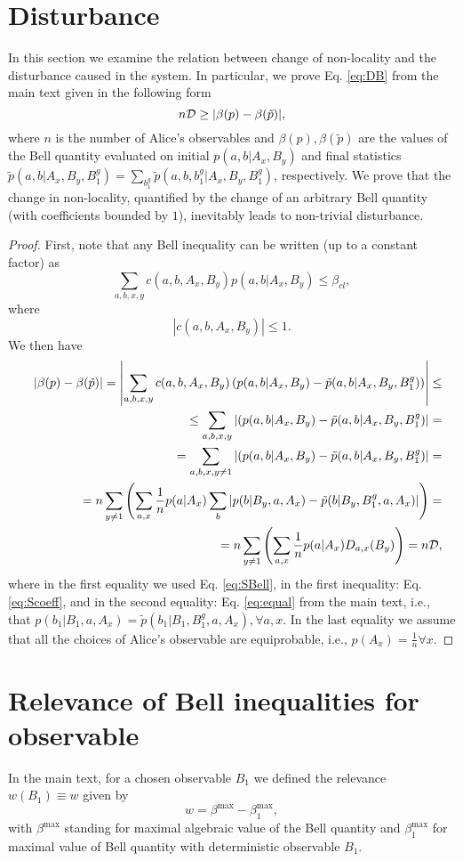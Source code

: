 \documentclass[pra,twocolumn,showpacs,preprintnumbers,amsmath,amssymb,superscriptaddress]{revtex4-1}
\def\be{\begin{equation}}
\def\ee{\end{equation}}
\def\ben{\begin{eqnarray}}
\def\een{\end{eqnarray}}
\def\omeas{B_1}
\def\ogentle{B_1^g}
\def\dist{{\cal D}}
\def\relev{w}
\begin{document}
\begin{appendix}
\section{Disturbance}\label{secDIST}
In this section we examine the relation between change of non-locality and the disturbance caused in the system. In particular, we prove Eq. \eqref{eq:DB} from the main text given in the following form
\be
\label{eq:SDB}
n \dist \geq |\beta(p)- \beta(\tilde p)|,
\ee
where $n$ is the number of Alice's observables and $\beta(p), \beta(\tilde p)$ are the values of the Bell quantity evaluated on initial $p(a,b|A_x,B_y)$ and final statistics $\tilde p(a,b|A_x,B_y,\ogentle)=\sum_{b_1^g} \tilde p(a,b,b_1^g|A_x,B_y,\ogentle)$, respectively. We prove that the change in non-locality, quantified by the change of an arbitrary Bell quantity (with coefficients bounded by $1$), inevitably leads to non-trivial disturbance.\\
\begin{proof}
First, note that
any Bell inequality can be written (up to a constant factor) as
\be
\label{eq:SBell}
\sum_{a,b,x,y} c(a,b,A_x,B_y) p(a,b|A_x,B_y) \leq \beta_{cl},
\ee
where 
\be
\label{eq:Scoeff}
|c(a,b,A_x,B_y)|\leq 1.
\ee
We then have
\ben
&&|\beta(p) - \beta(\tilde p)| = \left|
\sum_{a,b,x,y} c(a,b,A_x,B_y) \left(p(a,b|A_x,B_y) -\tilde p(a,b|A_x,B_y,\ogentle) \right)\right| \leq  \nonumber \\
&&\leq 
\sum_{a,b,x,y} \left|(p(a,b|A_x,B_y) -\tilde p(a,b|A_x,B_y,\ogentle) \right| =  \nonumber \\
&& =
\sum_{a,b,x,y\not=1} \left|(p(a,b|A_x,B_y) -\tilde p(a,b|A_x,B_y,\ogentle) \right| =  \nonumber \\
&& = 
n \sum_{y\not=1}  \left(\sum_{a,x} \frac{1}{n} p(a|A_x) \sum_b |p(b|B_y,a,A_x) - \tilde p(b|B_y,\ogentle,a,A_x)| \right)=
\nonumber  \\
&& =
n \sum_{y\not=1}  \left(\sum_{a,x} \frac{1}{n} p(a|A_x) D_{a,x}(B_y)\right) =n  \dist,
\een
where in the first equality we used Eq. \eqref{eq:SBell}, in the first inequality: Eq.\eqref{eq:Scoeff}, and in the second equality: Eq. \eqref{eq:equal} from the main text, i.e., that $p(b_1|\omeas,a,A_x)= \tilde  p(b_1|\omeas,\ogentle,a,A_x), \forall {a,x}$. In the last equality we assume that all the choices of Alice's observable are equiprobable, i.e., $p(A_x)=\frac{1}{n} \forall x$.
\end{proof}


\section{Relevance of Bell inequalities for observable}\label{secRELEV}
In the main text, for a chosen observable $B_1$ we defined the relevance $\relev(B_1)\equiv \relev$ given by
\be
\label{eq:Srelev}
\relev= \beta^{\max}-\beta^{\max}_{1},
\ee
with $\beta^{\max}$ standing for maximal algebraic value of the Bell quantity and $\beta^{\max}_{1}$ for maximal value of Bell quantity with deterministic observable $B_1$.\\


\end{appendix}
\end{document}
